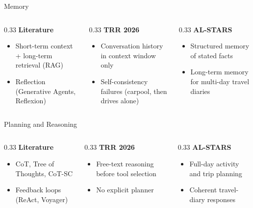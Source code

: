\documentclass{beamer}
\begin{document}
\begin{frame}{Memory}
\begin{columns}[t]
\begin{column}{0.33\textwidth}
\textbf{Literature}
\begin{itemize}
\item Short-term context + long-term retrieval (RAG)
\item Reflection (Generative Agents, Reflexion)
\end{itemize}
\end{column}
\begin{column}{0.33\textwidth}
\textbf{TRR 2026}
\begin{itemize}
\item Conversation history in context window only
\item Self-consistency failures (carpool, then drives alone)
\end{itemize}
\end{column}
\begin{column}{0.33\textwidth}
\textbf{AL-STARS}
\begin{itemize}
\item Structured memory of stated facts
\item Long-term memory for multi-day travel diaries
\end{itemize}
\end{column}
\end{columns}
\end{frame}


\begin{frame}{Planning and Reasoning}
\begin{columns}[t]
\begin{column}{0.33\textwidth}
\textbf{Literature}
\begin{itemize}
\item CoT, Tree of Thoughts, CoT-SC
\item Feedback loops (ReAct, Voyager)
\end{itemize}
\end{column}
\begin{column}{0.33\textwidth}
\textbf{TRR 2026}
\begin{itemize}
\item Free-text reasoning before tool selection
\item No explicit planner
\end{itemize}
\end{column}
\begin{column}{0.33\textwidth}
\textbf{AL-STARS}
\begin{itemize}
\item Full-day activity and trip planning
\item Coherent travel-diary responses
\end{itemize}
\end{column}
\end{columns}
\end{frame}
\end{document}
